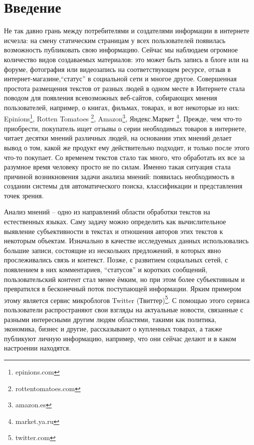 
\section*{Введение}

Не так давно грань между потребителями и создателями информации в интернете
исчезла: на смену статическим страницам у всех пользователей появилась
возможность публиковать свою информацию. Сейчас мы наблюдаем огромное
количество видов создаваемых материалов: это может быть запись
в блоге или на форуме, фотография или видеозапись на соответствующем
ресурсе, отзыв в интернет-магазине,``статус'' в социальной сети и многое другое.
Совершенная простота размещения текстов от разных людей в одном месте
в Интернете стала поводом для появления всевозможных веб-сайтов, собирающих мнения
пользователей, например, о книгах, фильмах, товарах, и вот некоторые из них:
Epinions\footnote{epinions.com}, Rotten Tomatoes \footnote{rottentomatoes.com},
Amazon\footnote{amazon.es}, Яндекс.Маркет \footnote{market.ya.ru}. Прежде, чем что-то приобрести,
покупатель ищет отзывы о серии необходимых товаров в интернете, читает
десятки мнений различных людей, на основании этих мнений делает вывод о том,
какой же продукт ему действительно подходит, и только после этого что-то покупает.
Со временем текстов стало так много, что обработать их все за разумное время человеку просто
не по силам. Именно такая ситуация стала причиной возникновения
задачи анализа мнений: появилась необходимость в создании системы для
автоматического поиска, классификации и представления точек зрения.

Анализ мнений -- одно из направлений области обработки текстов на естественных
языках. Саму задачу можно определить как вычислительное выявление
субъективности в текстах и отношения авторов этих текстов к некоторым объектам.
Изначально в качестве исследуемых данных использовались большие записи,
состоящие из нескольких предложений, в которых явно прослеживались связь и
контекст. Позже, с развитием социальных сетей, с появлением в них комментариев,
``статусов'' и  коротких сообщений, пользовательский контент стал менее ёмким,
но при этом более субъективным и превратился в бесконечный поток поступающей
информации. Ярким примером этому является сервис микроблогов
Twitter (Твиттер)\footnote{twitter.com}. С помощью этого сервиса пользователи распространяют
свои взгляды на актуальные новости, связанные с разными интересными
другим людям областями, такими как политика, экономика, бизнес и другие,
рассказывают о купленных товарах, а также публикуют личную информацию, например,
что они сейчас делают и в каком настроении находятся.


